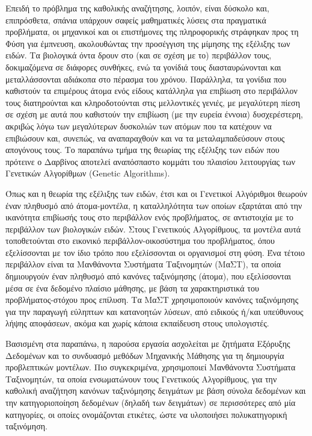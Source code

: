 Επειδή το πρόβλημα της καθολικής αναζήτησης, λοιπόν, είναι δύσκολο και, επιπρόσθετα, σπάνια υπάρχουν σαφείς μαθηματικές λύσεις στα πραγματικά προβλήματα, οι μηχανικοί και οι επιστήμονες της πληροφορικής στράφηκαν προς τη Φύση για έμπνευση, ακολουθώντας την προσέγγιση της μίμησης της εξέλιξης των ειδών. Τα βιολογικά όντα δρουν στο (και σε σχέση με το) περιβάλλον τους, δοκιμαζόμενα σε διάφορες συνθήκες, ενώ τα γονίδιά τους διασταυρώνονται και μεταλλάσσονται αδιάκοπα στο πέρασμα του χρόνου. Παράλληλα, τα γονίδια που καθιστούν τα επιμέρους άτομα ενός είδους κατάλληλα για επιβίωση στο περιβάλλον τους διατηρούνται και κληροδοτούνται στις μελλοντικές γενιές, με μεγαλύτερη πίεση σε σχέση με αυτά που καθιστούν την επιβίωση (με την ευρεία έννοια) δυσχερέστερη, ακριβώς λόγω των μεγαλύτερων δυσκολιών των ατόμων που τα κατέχουν να επιβιώσουν και, συνεπώς, να αναπαραχθούν και να τα μεταλαμπαδεύσουν στους απογόνους τους. Το παραπάνω τμήμα της θεωρίας της εξέλιξης των ειδών που πρότεινε ο Δαρβίνος αποτελεί αναπόσπαστο κομμάτι του πλαισίου λειτουργίας των Γενετικών Αλγορίθμων (Genetic Algorithms).

Όπως και η θεωρία της εξέλιξης των ειδών, έτσι και οι Γενετικοί Αλγόριθμοι θεωρούν έναν πληθυσμό από άτομα-μοντέλα, η καταλληλότητα των οποίων εξαρτάται από την ικανότητα επιβίωσής τους στο περιβάλλον ενός προβλήματος, σε αντιστοιχία με το περιβάλλον των βιολογικών ειδών. Στους Γενετικούς Αλγορίθμους, τα μοντέλα αυτά τοποθετούνται στο εικονικό περιβάλλον-οικοσύστημα του προβλήματος, όπου εξελίσσονται με τον ίδιο τρόπο που εξελίσσονται οι οργανισμοί στη φύση. Ένα τέτοιο περιβάλλον είναι τα Μανθάνοντα Συστήματα Ταξινομητών (ΜαΣΤ), τα οποία δημιουργούν έναν πληθυσμό από κανόνες ταξινόμησης (άτομα), που εξελίσσονται μέσα σε ένα δεδομένο πλαίσιο μάθησης, με βάση τα χαρακτηριστικά του προβλήματος-στόχου προς επίλυση. Τα ΜαΣΤ χρησιμοποιούν κανόνες ταξινόμησης για την παραγωγή εύληπτων και κατανοητών λύσεων, από ειδικούς ή/και υπεύθυνους λήψης αποφάσεων, ακόμα και χωρίς κάποια εκπαίδευση στους υπολογιστές.

Βασισμένη στα παραπάνω, η παρούσα εργασία ασχολείται με ζητήματα Εξόρυξης Δεδομένων και το συνδυασμό μεθόδων Μηχανικής Μάθησης για τη δημιουργία προβλεπτικών μοντέλων. Πιο συγκεκριμένα, χρησιμοποιεί Μανθάνοντα Συστήματα Ταξινομητών, τα οποία ενσωματώνουν τους Γενετικούς Αλγορίθμους, για την καθολική αναζήτηση κανόνων ταξινόμησης δειγμάτων με βάση σύνολα δεδομένων και την κατηγοριοποίηση δεδομένων (δηλαδή των δειγμάτων) σε περισσότερες από μία κατηγορίες, οι οποίες ονομάζονται ετικέτες, ώστε να υλοποιήσει πολυκατηγορική ταξινόμηση.

